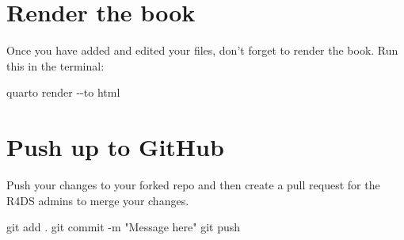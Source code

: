 \documentclass[
  letterpaper,
  DIV=11,
  numbers=noendperiod]{scrreprt}
\newenvironment{Shaded}{\begin{snugshade}}{\end{snugshade}}
\newcommand{\AttributeTok}[1]{\textcolor[rgb]{0.40,0.46,0.14}{#1}}
\newcommand{\ExtensionTok}[1]{\textcolor[rgb]{0.00,0.46,0.62}{#1}}
\newcommand{\FunctionTok}[1]{\textcolor[rgb]{0.28,0.35,0.67}{#1}}
\newcommand{\NormalTok}[1]{\textcolor[rgb]{0.00,0.46,0.62}{#1}}
\newcommand{\StringTok}[1]{\textcolor[rgb]{0.13,0.47,0.30}{#1}}
\begin{document}
\hypertarget{render-the-book}{%
\section*{Render the book}\label{render-the-book}}

Once you have added and edited your files, don't forget to render the
book. Run this in the terminal:

\begin{Shaded}
\begin{Highlighting}[]
\ExtensionTok{quarto}\NormalTok{ render }\AttributeTok{{-}{-}to}\NormalTok{ html}
\end{Highlighting}
\end{Shaded}

\hypertarget{push-up-to-github}{%
\section*{Push up to GitHub}\label{push-up-to-github}}

Push your changes to your forked repo and then create a pull request for
the R4DS admins to merge your changes.

\begin{Shaded}
\begin{Highlighting}[]
\FunctionTok{git}\NormalTok{ add .}
\FunctionTok{git}\NormalTok{ commit }\AttributeTok{{-}m} \StringTok{"Message here"}
\FunctionTok{git}\NormalTok{ push}
\end{Highlighting}
\end{Shaded}
\end{document}
